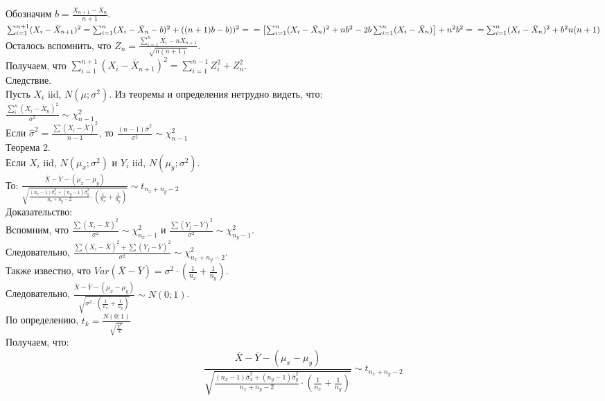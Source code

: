 \documentclass[pdftex,12pt,a4paper]{article}
\begin{document}
Обозначим $b=\frac{X_{n+1}-\bar{X}_{n}}{n+1}$. \\

$\sum_{i=1}^{n+1} (X_{i}-\bar{X}_{n+1})^{2}=
\sum_{i=1}^{n}(X_{i}-\bar{X}_{n}-b)^{2}+((n+1)b-b))^2= \\
=\left[\sum_{i=1}^{n}(X_{i}-\bar{X}_{n})^{2}+nb^{2}-2b\sum_{i=1}^{n}(X_{i}-\bar{X}_{n})\right]
+n^{2}b^{2}= \\
=\sum_{i=1}^{n}(X_{i}-\bar{X}_{n})^{2}+b^{2}n(n+1)$ \\
Осталось вспомнить, что
$Z_{n}=\frac{\sum_{i=1}^{n}X_{i}-nX_{n+1}}{\sqrt{n(n+1)}}$. \\
Получаем, что $\sum_{i=1}^{n+1}
(X_{i}-\bar{X}_{n+1})^{2}=\sum_{i=1}^{n-1}Z_{i}^{2}+Z_{n}^{2}$. \\


Следствие. \\
Пусть $X_{i}$ iid, $N(\mu;\sigma^{2})$.
Из теоремы и определения нетрудно видеть, что: \\
$\frac{\sum_{i}^{n}(X_{i}-\bar{X}_{n})^{2}}{\sigma^{2}}\sim
\chi_{n-1}^{2}$ \\
Если $\hat{\sigma}^{2}=\frac{\sum(X_{i}-\bar{X})^{2}}{n-1}$, то
$\frac{(n-1)\hat{\sigma}^{2}}{\sigma^{2}}\sim
\chi_{n-1}^{2}$ \\


Теорема 2. \\
Если $X_{i}$ iid, $N(\mu_{x};\sigma^{2})$ и $Y_{i}$ iid,
$N(\mu_{y};\sigma^{2})$. \\
То: $\frac{\bar{X}-\bar{Y}-(\mu_{x}-\mu_{y})} { \sqrt{
    \frac{(n_{x}-1)\hat{\sigma}_{x}^{2}+(n_{y}-1)\hat{\sigma}_{y}^{2}}{n_{x}+n_{y}-2}
    \cdot
    \left(\frac{1}{n_{x}}+\frac{1}{n_{y}}\right)
    }
}\sim t_{n_{x}+n_{y}-2}$ \\
Доказательство: \\
Вспомним, что $\frac{\sum (X_{i}-\bar{X})^{2}}{\sigma^{2}}\sim
\chi_{n_{x}-1}^{2}$ и $\frac{\sum
(Y_{j}-\bar{Y})^{2}}{\sigma^{2}}\sim
\chi_{n_{y}-1}^{2}$. \\
Следовательно, $\frac{\sum (X_{i}-\bar{X})^{2}+\sum
(Y_{j}-\bar{Y})^{2}}{\sigma^{2}}\sim
\chi_{n_{x}+n_{y}-2}^{2}$. \\
Также известно, что $Var(\bar{X}-\bar{Y})=\sigma^{2}\cdot
(\frac{1}{n_{x}}+\frac{1}{n_{y}})$. \\
Следовательно,
$\frac{\bar{X}-\bar{Y}-(\mu_{x}-\mu_{y})}{\sqrt{\sigma^{2}\cdot
(\frac{1}{n_{x}}+\frac{1}{n_{y}})}}\sim N(0;1)$. \\
По определению, $t_{k}=\frac{N(0;1)}{\sqrt{\frac{\chi^{k}}{k}}}$
\\
Получаем, что:
$$\frac{\bar{X}-\bar{Y}-(\mu_{x}-\mu_{y})} {
\sqrt{
    \frac{(n_{x}-1)\hat{\sigma}_{x}^{2}+(n_{y}-1)\hat{\sigma}_{y}^{2}}{n_{x}+n_{y}-2}
    \cdot
    \left(\frac{1}{n_{x}}+\frac{1}{n_{y}}\right)
    }
}\sim t_{n_{x}+n_{y}-2}$$
\end{document}
